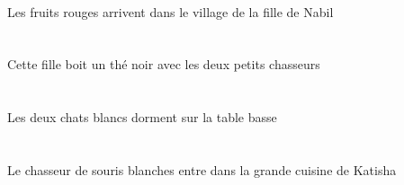 \begin{exe}
\DEFPlAbsG{}   \rougeAPlG{}   \fruitAPlAbsG{}    \DEFSgOblG{}    \DEFSgOblG{}    \INDSgOblG{}   \NabilDSgOblG{}   \DEG{}   \filleCSgOblG{}   \DEG{}   \villageCSgOblG{}   \DANSG{}  \arriverViPrsAPlG{}\\
Les fruits rouges arrivent dans le village de la fille de Nabil
\ex\glll
\DEFDuObl{}   \petitCDu{}   \chasseurCDuObl{}   \AVEC{}   \DEMSgErg{}   \filleCSgErg{}   \INDSgAbs{}   \noirBSg{}   \theBSgAbs{}  \boireVtPrsBSg{}\\
\DEFDuOblP{}   \petitCDuP{}   \chasseurCDuOblP{}   \AVECP{}   \DEMSgErgP{}   \filleCSgErgP{}   \INDSgAbsP{}   \noirBSgP{}   \theBSgAbsP{}  \boireVtPrsBSgP{}\\
\DEFDuOblG{}   \petitCDuG{}   \chasseurCDuOblG{}   \AVECG{}   \DEMSgErgG{}   \filleCSgErgG{}   \INDSgAbsG{}   \noirBSgG{}   \theBSgAbsG{}  \boireVtPrsBSgG{}\\
Cette fille boit un thé noir avec les deux petits chasseurs
\ex\glll
\DEFDuAbs{}   \blancDDu{}   \chatDDuAbs{}    \DEFSgObl{}   \basDSg{}   \tableDSgObl{}   \SUR{}  \dormirViPrsDDu{}\\
\DEFDuAbsP{}   \blancDDuP{}   \chatDDuAbsP{}    \DEFSgOblP{}   \basDSgP{}   \tableDSgOblP{}   \SURP{}  \dormirViPrsDDuP{}\\
\DEFDuAbsG{}   \blancDDuG{}   \chatDDuAbsG{}    \DEFSgOblG{}   \basDSgG{}   \tableDSgOblG{}   \SURG{}  \dormirViPrsDDuG{}\\
Les deux chats blancs dorment sur la table basse
\ex\glll
\DEFSgAbs{}    \INDPlObl{}   \blancBPl{}   \sourisBPlObl{}   \DE{}   \chasseurCSgAbs{}    \DEFSgObl{}    \INDSgObl{}   \KatishaASgObl{}   \DE{}   \grandDSg{}   \cuisineDSgObl{}   \DANS{}  \entrerViPrsCSg{}\\
\DEFSgAbsP{}    \INDPlOblP{}   \blancBPlP{}   \sourisBPlOblP{}   \DEP{}   \chasseurCSgAbsP{}    \DEFSgOblP{}    \INDSgOblP{}   \KatishaASgOblP{}   \DEP{}   \grandDSgP{}   \cuisineDSgOblP{}   \DANSP{}  \entrerViPrsCSgP{}\\
\DEFSgAbsG{}    \INDPlOblG{}   \blancBPlG{}   \sourisBPlOblG{}   \DEG{}   \chasseurCSgAbsG{}    \DEFSgOblG{}    \INDSgOblG{}   \KatishaASgOblG{}   \DEG{}   \grandDSgG{}   \cuisineDSgOblG{}   \DANSG{}  \entrerViPrsCSgG{}\\
Le chasseur de souris blanches entre dans la grande cuisine de Katisha
\ex\glll
\DEFSgErg{}   \tableDSgErg{}   \INDPlAbs{}   \rougeAPl{}   \fruitAPlAbs{}  \supporterVtPrsAPl{}\\
\DEFSgErgP{}   \tableDSgErgP{}   \INDPlAbsP{}   \rougeAPlP{}   \fruitAPlAbsP{}  \supporterVtPrsAPlP{}\\

\end{exe}
